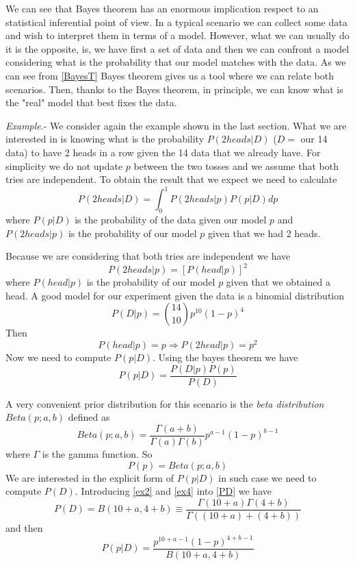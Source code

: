 \documentclass[onecolumn,           %
               showpacs,            %
               preprintnumbers,     %
               aps,                 %
               prl,          	    %
               letterpaper,             %
               superscriptaddress,      %
               nofootinbib,         %
               tightenlines,        %
               floats,floatfix      %
               ,usenatbib,
               ]{revtex4-1}
\begin{document}
We can see that Bayes theorem has an enormous implication respect to an statistical inferential point of view. In a typical scenario we can collect some data and wish to interpret them in terms of a model. However, what we can usually do it is the opposite, is, we have first a set of data and then we can confront a model considering what is the probability that our model matches with the data. As we can see from \eqref{BayesT} Bayes theorem gives us a tool where we can relate both scenarios. Then, thanks to the Bayes theorem, in principle, we can know what is the "real" model that best fixes the data. 

\textit{Example}.- We consider again the example shown in the last section. What we are interested in is knowing what is the probability $P(2heads|D)$ ($D=$ our 14 data) to have 2 heads in a row given the 14 data that we already have. For simplicity we do not update $p$ between the two tosses and we assume that both tries are independent. To obtain the result that we expect we need to calculate
\begin{equation}\label{ex}
P(2heads|D)=\int^1_0 P(2heads|p)P(p|D)dp
\end{equation}
where $P(p|D)$ is the probability of the data given our model $p$ and $P(2heads|p)$ is the probability of our model $p$ given that we had 2 heads. 

Because we are considering that both tries are independent we have
\begin{equation}
P(2heads|p)=[P(head|p)]^2
\end{equation}
where $P(head|p)$ is the probability of our model $p$ given that we obtained a head. A good model for our experiment given the data is a binomial distribution
\begin{equation}\label{ex2}
P(D|p)=\binom{14}{10}p^{10}(1-p)^4
\end{equation}
Then 
\begin{equation}\label{ex1}
P(head|p)=p\Rightarrow P(2head|p)=p^2
\end{equation}
Now we need to compute $P(p|D)$. Using the bayes theorem we have
\begin{equation}
P(p|D)=\frac{P(D|p)P(p)}{P(D)}
\end{equation}

A very convenient prior distribution for this scenario is the \textit{beta distribution} $Beta(p;a,b)$ defined as
\begin{equation}\label{ex3}
Beta(p;a,b)=\frac{\Gamma(a+b)}{\Gamma(a)\Gamma(b)}p^{a-1}(1-p)^{b-1}
\end{equation}
where $\Gamma$ is the gamma function. So
\begin{equation}\label{ex4}
P(p)=Beta(p;a,b)
\end{equation}
We are interested in the explicit form of $P(p|D)$ in such case we need to compute $P(D)$. Introducing \eqref{ex2} and \eqref{ex4} into \eqref{PD} we have
\begin{equation}
P(D)=B(10+a,4+b)\equiv \frac{\Gamma(10+a)\Gamma(4+b)}{\Gamma((10+a)+(4+b))}
\end{equation}
and then
\begin{equation}\label{ex4}
P(p|D)=\frac{p^{10+a-1}(1-p)^{4+b-1}}{B(10+a,4+b)}
\end{equation}
\end{document}
